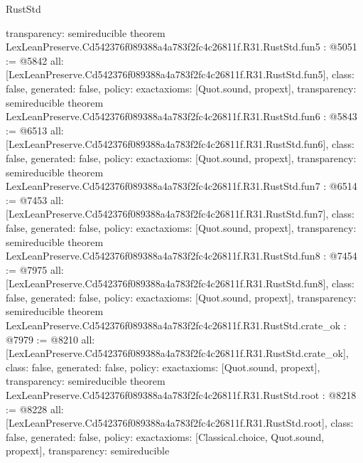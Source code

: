 \begin{lexlean}{RustStd}
\begin{coremodule}
{  transparency: semireducible
}
theorem LexLeanPreserve.Cd542376f089388a4a783f2fc4c26811f.R31.RustStd.fun5 : @5051 := @5842 {
  all: [LexLeanPreserve.Cd542376f089388a4a783f2fc4c26811f.R31.RustStd.fun5],
  class: false,
  generated: false,
  policy: exact{axioms: [Quot.sound, propext]},
  transparency: semireducible
}
theorem LexLeanPreserve.Cd542376f089388a4a783f2fc4c26811f.R31.RustStd.fun6 : @5843 := @6513 {
  all: [LexLeanPreserve.Cd542376f089388a4a783f2fc4c26811f.R31.RustStd.fun6],
  class: false,
  generated: false,
  policy: exact{axioms: [Quot.sound, propext]},
  transparency: semireducible
}
theorem LexLeanPreserve.Cd542376f089388a4a783f2fc4c26811f.R31.RustStd.fun7 : @6514 := @7453 {
  all: [LexLeanPreserve.Cd542376f089388a4a783f2fc4c26811f.R31.RustStd.fun7],
  class: false,
  generated: false,
  policy: exact{axioms: [Quot.sound, propext]},
  transparency: semireducible
}
theorem LexLeanPreserve.Cd542376f089388a4a783f2fc4c26811f.R31.RustStd.fun8 : @7454 := @7975 {
  all: [LexLeanPreserve.Cd542376f089388a4a783f2fc4c26811f.R31.RustStd.fun8],
  class: false,
  generated: false,
  policy: exact{axioms: [Quot.sound, propext]},
  transparency: semireducible
}
theorem LexLeanPreserve.Cd542376f089388a4a783f2fc4c26811f.R31.RustStd.crate_ok : @7979 := @8210 {
  all: [LexLeanPreserve.Cd542376f089388a4a783f2fc4c26811f.R31.RustStd.crate_ok],
  class: false,
  generated: false,
  policy: exact{axioms: [Quot.sound, propext]},
  transparency: semireducible
}
theorem LexLeanPreserve.Cd542376f089388a4a783f2fc4c26811f.R31.RustStd.root : @8218 := @8228 {
  all: [LexLeanPreserve.Cd542376f089388a4a783f2fc4c26811f.R31.RustStd.root],
  class: false,
  generated: false,
  policy: exact{axioms: [Classical.choice, Quot.sound, propext]},
  transparency: semireducible
}


\end{coremodule}
\end{lexlean}
